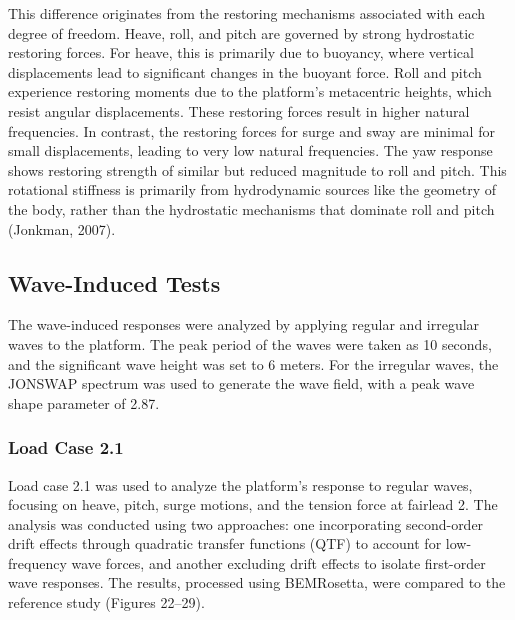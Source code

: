 \documentclass[a4paper, 11pt]{article}
\begin{document}
This difference originates from the restoring mechanisms associated with each degree of freedom. Heave, roll, and pitch are governed by strong hydrostatic restoring forces. For heave, this is primarily due to buoyancy, where vertical displacements lead to significant changes in the buoyant force. Roll and pitch experience restoring moments due to the platform's metacentric heights, which resist angular displacements. These restoring forces result in higher natural frequencies. In contrast, the restoring forces for surge and sway are minimal for small displacements, leading to very low natural frequencies. The yaw response shows restoring strength of similar but reduced magnitude to roll and pitch. This rotational stiffness is primarily from hydrodynamic sources like the geometry of the body, rather than the hydrostatic mechanisms that dominate roll and pitch (Jonkman, 2007).


\subsection{Wave-Induced Tests}
\hspace*{0.5cm}The wave-induced responses were analyzed by applying regular and irregular waves to the platform. The peak period of the waves were taken as 10 seconds, and the significant wave height was set to 6 meters. For the irregular waves, the JONSWAP spectrum was used to generate the wave field, with a peak wave shape parameter of 2.87. 


\subsubsection{Load Case 2.1}

\hspace{0.5cm}Load case 2.1 was used to analyze the platform’s response to regular waves, focusing on heave, pitch, surge motions, and the tension force at fairlead 2. The analysis was conducted using two approaches: one incorporating second-order drift effects through quadratic transfer functions (QTF) to account for low-frequency wave forces, and another excluding drift effects to isolate first-order wave responses. The results, processed using BEMRosetta, were compared to the reference study (Figures 22–29).
\end{document}
